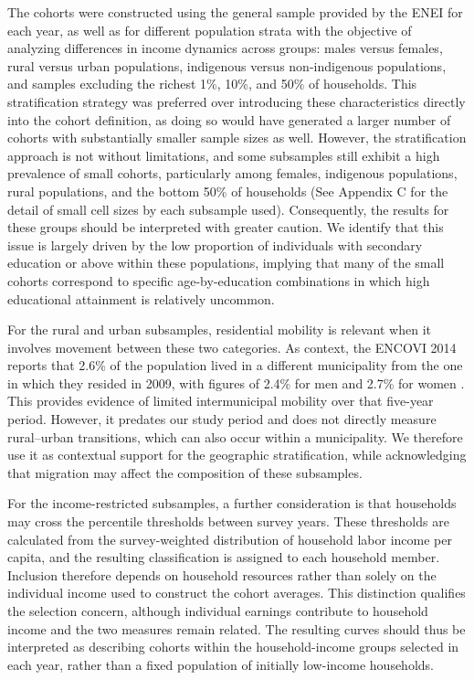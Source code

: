 \documentclass{article}
\begin{document}
The cohorts were constructed using the general sample provided by the ENEI for each year, as well as for different population strata with the objective of analyzing differences in income dynamics across groups: males versus females, rural versus urban populations, indigenous versus non-indigenous populations, and samples excluding the richest 1\%, 10\%, and 50\% of households. This stratification strategy was preferred over introducing these characteristics directly into the cohort definition, as doing so would have generated a larger number of cohorts with substantially smaller sample sizes as well. However, the stratification approach is not without limitations, and some subsamples still exhibit a high prevalence of small cohorts, particularly among females, indigenous populations, rural populations, and the bottom 50\% of households (See Appendix C for the detail of small cell sizes by each subsample used). Consequently, the results for these groups should be interpreted with greater caution. We identify that this issue is largely driven by the low proportion of individuals with secondary education or above within these populations, implying that many of the small cohorts correspond to specific age-by-education combinations in which high educational attainment is relatively uncommon.

For the rural and urban subsamples, residential mobility is relevant when it involves movement between these two categories. As context, the ENCOVI 2014 reports that 2.6\% of the population lived in a different municipality from the one in which they resided in 2009, with figures of 2.4\% for men and 2.7\% for women \parencite[section 2.8, p.~37]{ine2016encovi2014}. This provides evidence of limited intermunicipal mobility over that five-year period. However, it predates our study period and does not directly measure rural--urban transitions, which can also occur within a municipality. We therefore use it as contextual support for the geographic stratification, while acknowledging that migration may affect the composition of these subsamples.

For the income-restricted subsamples, a further consideration is that households may cross the percentile thresholds between survey years. These thresholds are calculated from the survey-weighted distribution of household labor income per capita, and the resulting classification is assigned to each household member. Inclusion therefore depends on household resources rather than solely on the individual income used to construct the cohort averages. This distinction qualifies the selection concern, although individual earnings contribute to household income and the two measures remain related. The resulting curves should thus be interpreted as describing cohorts within the household-income groups selected in each year, rather than a fixed population of initially low-income households.
\end{document}
